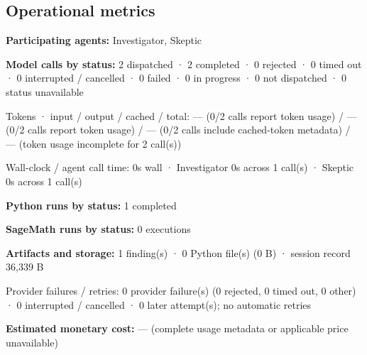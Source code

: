 \documentclass[11pt]{article}
\begin{document}
\subsection{Operational metrics}
\textbf{Participating agents:} Investigator, Skeptic\par
\textbf{Model calls by status:} 2 dispatched · 2 completed · 0 rejected · 0 timed out · 0 interrupted / cancelled · 0 failed · 0 in progress · 0 not dispatched · 0 status unavailable\par
Tokens · input / output / cached / total: — (0/2 calls report token usage) / — (0/2 calls report token usage) / — (0/2 calls include cached-token metadata) / — (token usage incomplete for 2 call(s))\par
Wall-clock / agent call time: 0s wall · Investigator 0s across 1 call(s) · Skeptic 0s across 1 call(s)\par
\textbf{Python runs by status:} 1 completed\par
\textbf{SageMath runs by status:} 0 executions\par
\textbf{Artifacts and storage:} 1 finding(s) · 0 Python file(s) (0 B) · session record 36,339 B\par
Provider failures / retries: 0 provider failure(s) (0 rejected, 0 timed out, 0 other) · 0 interrupted / cancelled · 0 later attempt(s); no automatic retries\par
\textbf{Estimated monetary cost:} — (complete usage metadata or applicable price unavailable)\par
\end{document}
